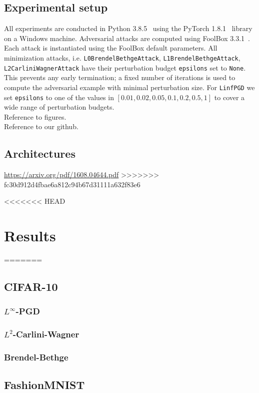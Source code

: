\documentclass{article}
\begin{document}
\subsection{Experimental setup}
All experiments are conducted in Python 3.8.5~\cite{van1995python} using the PyTorch 1.8.1~\cite{pytorch} library on a Windows machine. Adversarial attacks are computed using FoolBox 3.3.1~\cite{rauber2017foolbox}. Each attack is instantiated using the FoolBox default parameters. All minimization attacks, i.e. \texttt{L0BrendelBethgeAttack}, \texttt{L1BrendelBethgeAttack}, \texttt{L2CarliniWagnerAttack} have their perturbation budget \texttt{epsilons} set to \texttt{None}. This prevents any early termination; a fixed number of iterations is used to compute the adversarial example with minimal perturbation size. For \texttt{LinfPGD} we set \texttt{epsilons} to one of the values in $[0.01, 0.02, 0.05, 0.1, 0.2, 0.5, 1]$ to cover a wide range of perturbation budgets.\\

\noindent Reference to figures.\\
Reference to our github.

\subsection{Architectures}
\url{https://arxiv.org/pdf/1608.04644.pdf}
>>>>>>> fc30d912d4fbae6a812c94b67d31111a632f83e6

<<<<<<< HEAD
\section{Results}
=======

\subsection{CIFAR-10}
\subsubsection{$L^\infty$-PGD}
\subsubsection{$L^2$-Carlini-Wagner}
\subsubsection{Brendel-Bethge}

\subsection{FashionMNIST}
\end{document}
